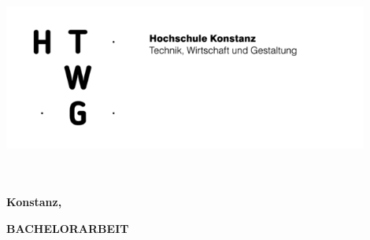 
\begin{titlepage}

\vspace*{-3.5cm}

\begin{center}
\includegraphics[width=12cm]{template/htwg-logo}


\vspace{2.5cm}

	\huge{
		\textbf{\thema} \\[5cm]
	}
	\Large{
		\textbf{\autor}} \\[6.5cm]
	\large{
		\textbf{Konstanz, \abgabedatum} \\[2.3cm]
	}

	\Huge{
		\textbf{{\sf BACHELORARBEIT}}
	}
\end{center}

\end{titlepage}
